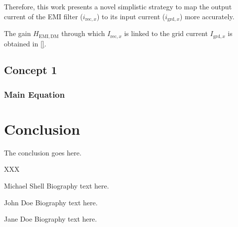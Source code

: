 \documentclass[journal,a4paper,10pt,twoside]{IEEEtran} %
\begin{document}
	Therefore, this work presents a novel simplistic strategy to map the output current of the EMI filter ($i_{\mathrm{rec},x}$) to its input current ($i_{\mathrm{grd},x}$) more accurately.
	
	
	{\color{gray}The gain $H_\mathrm{EMI,DM}$ through which $I_{\mathrm{rec},x}$ is linked to the grid current $I_{\mathrm{grd},x}$ is obtained in \eqref{}.}
	
	
	
	
	
	
	
	
	
	
	\subsection{Concept 1}
	\subsubsection{Main Equation}
	
	
	\section{Conclusion}
	The conclusion goes here.
	
	
	
	
	
	\begin{IEEEbiography}{XXX}
		
	\end{IEEEbiography}
	
	\begin{IEEEbiography}{Michael Shell}
		Biography text here.
	\end{IEEEbiography}
	
	\begin{IEEEbiographynophoto}{John Doe}
		Biography text here.
	\end{IEEEbiographynophoto}


	\begin{IEEEbiographynophoto}{Jane Doe}
		Biography text here.
	\end{IEEEbiographynophoto}
	
\end{document}
